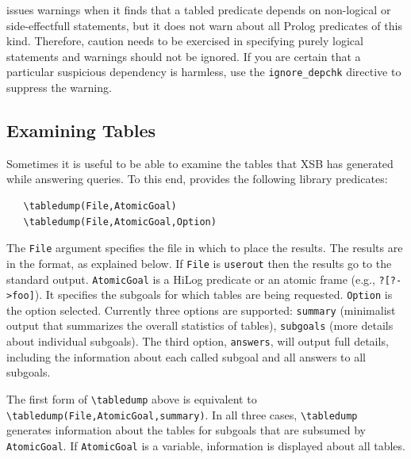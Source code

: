 \documentclass[11pt]{article}
\newcommand{\ERGO}{\mbox{\smaller{\ensuremath{\cal{E}}\smaller{{\sc{RGO}}}}}\xspace}
\newcommand{\FLSYSTEM}{\ERGO}
\newcommand{\bs}{\textbackslash}
\begin{document}
\FLSYSTEM issues warnings when it finds that a tabled predicate depends on
non-logical or side-effectfull statements, but it does not warn about all
Prolog predicates of this kind. Therefore, caution needs to be exercised in
specifying purely logical statements and warnings should not be ignored.
If you are certain that a particular suspicious dependency
is harmless, use the {\tt ignore\_depchk} directive to suppress the warning.


\subsection{Examining Tables}\label{sec-tabledump}

Sometimes it is useful to be able to examine the tables that XSB has
generated while answering queries. To this end, \FLSYSTEM provides 
the following library predicates:
\index{\bs{}tabledump}
\begin{verbatim}
   \tabledump(File,AtomicGoal)
   \tabledump(File,AtomicGoal,Option)
\end{verbatim}
The \texttt{File} argument specifies the file in which to place the results.
The results are in the \FLSYSTEM format, as explained below.
If \texttt{File} is \texttt{userout} then the results go to the standard
output.  \texttt{AtomicGoal} is a HiLog predicate or an atomic frame
(e.g., \texttt{?[?->foo]}).
It specifies the subgoals for which tables are
being requested.
\texttt{Option} is the option selected. Currently three options are
supported:
\texttt{summary} (minimalist output that summarizes the overall statistics
of tables), \texttt{subgoals} (more details about individual subgoals). The
third option, \texttt{answers},
will output full details, including the information about each called subgoal
and all answers to all
subgoals.

The first form of \texttt{\bs{}tabledump}  above is equivalent to
\texttt{\bs{}tabledump(File,AtomicGoal,summary)}. 
In all three cases, \texttt{\bs{}tabledump} generates information
about the tables for subgoals that are subsumed by \texttt{AtomicGoal}. If
\texttt{AtomicGoal} is a variable, information is displayed about all
tables.   
\end{document}

